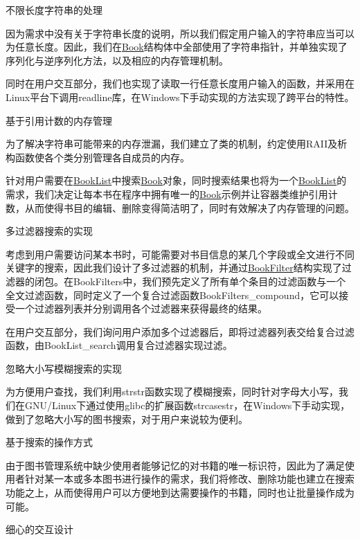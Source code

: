 \begin{DoxyEnumerate}
\item 不限长度字符串的处理

因为需求中没有关于字符串长度的说明，所以我们假定用户输入的字符串应当可以为任意长度。因此，我们在{\ttfamily \hyperlink{structBook}{Book}}结构体中全部使用了字符串指针，并单独实现了序列化与逆序列化方法，以及相应的内存管理机制。

同时在用户交互部分，我们也实现了读取一行任意长度用户输入的函数，并采用在{\ttfamily Linux}平台下调用{\ttfamily readline}库，在{\ttfamily Windows}下手动实现的方法实现了跨平台的特性。
\item 基于{\ttfamily 引用计数}的内存管理

为了解决字符串可能带来的内存泄漏，我们建立了类的机制，约定使用\-R\-A\-I\-I及析构函数使各个类分别管理各自成员的内存。

针对用户需要在{\ttfamily \hyperlink{structBookList}{Book\-List}}中搜索{\ttfamily \hyperlink{structBook}{Book}}对象，同时搜索结果也将为一个{\ttfamily \hyperlink{structBookList}{Book\-List}}的需求，我们决定让每本书在程序中拥有唯一的{\ttfamily \hyperlink{structBook}{Book}}示例并让容器类维护引用计数，从而使得书目的编辑、删除变得简洁明了，同时有效解决了内存管理的问题。
\item 多过滤器搜索的实现

考虑到用户需要访问某本书时，可能需要对书目信息的某几个字段或全文进行不同关键字的搜索，因此我们设计了多过滤器的机制，并通过{\ttfamily \hyperlink{structBookFilter}{Book\-Filter}}结构实现了过滤器的闭包。在{\ttfamily Book\-Filters}中，我们预先定义了所有单个条目的过滤函数与一个全文过滤函数，同时定义了一个复合过滤函数{\ttfamily Book\-Filters\-\_\-compound}，它可以接受一个过滤器列表并分别调用各个过滤器来获得最终的结果。

在用户交互部分，我们询问用户添加多个过滤器后，即将过滤器列表交给复合过滤函数，由{\ttfamily Book\-List\-\_\-search}调用复合过滤器实现过滤。
\item 忽略大小写模糊搜索的实现

为方便用户查找，我们利用{\ttfamily strstr}函数实现了模糊搜索，同时针对字母大小写，我们在{\ttfamily G\-N\-U/\-Linux}下通过使用{\ttfamily glibc}的扩展函数{\ttfamily strcasestr}，在{\ttfamily Windows}下手动实现，做到了忽略大小写的图书搜索，对于用户来说较为便利。
\item 基于搜索的操作方式

由于图书管理系统中缺少使用者能够记忆的对书籍的唯一标识符，因此为了满足使用者针对某一本或多本图书进行操作的需求，我们将修改、删除功能也建立在搜索功能之上，从而使得用户可以方便地到达需要操作的书籍，同时也让批量操作成为可能。
\item 细心的交互设计


\end{DoxyEnumerate}
